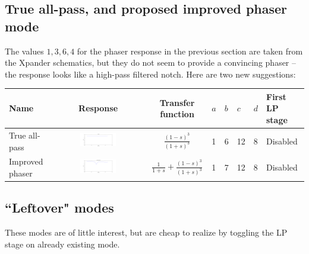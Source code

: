 \documentclass[a4paper,10pt]{article}
\begin{document}
\subsection{True all-pass, and proposed improved phaser mode}

The values $1, 3, 6, 4$ for the phaser response in the previous section are taken from the Xpander schematics, but they do not seem to provide a convincing phaser -- the response looks like a high-pass filtered notch. Here are two new suggestions:

\begin{tabular}{lcclllll}
\hline
Name & Response & Transfer function & $a$ & $b$ & $c$ & $d$ & First LP stage \\
\hline
True all-pass & \includegraphics[width=0.4\textwidth]{response_true_ap.pdf} & $\frac{(1 - s)^3}{(1 + s)^3}$ & 1 & 6 & 12 & 8 & Disabled \\
\hline
Improved phaser & \includegraphics[width=0.4\textwidth]{response_improved_phaser.pdf} & $\frac{1}{1 + s} + \frac{(1 - s)^3}{(1 + s)^3}$ & 1 & 7 & 12 & 8 & Disabled \\
\hline
\end{tabular}

\subsection{``Leftover" modes}

These modes are of little interest, but are cheap to realize by toggling the LP stage on already existing mode.
\end{document}
